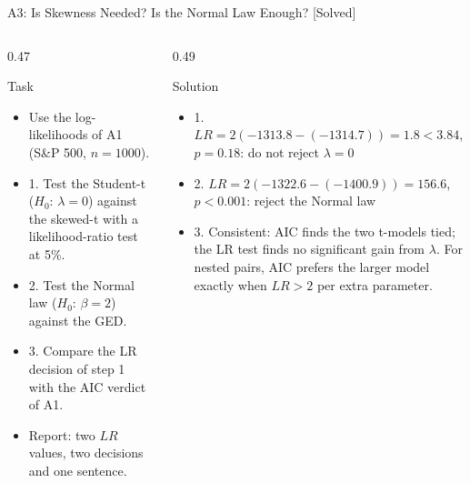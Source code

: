 \begin{frame}{A3: Is Skewness Needed? Is the Normal Law Enough? [Solved]}
\itemsize{\scriptsize}
\begin{columns}[T]
\begin{column}{0.47\textwidth}
\begin{block}{Task}
\begin{itemize}
    \item Use the log-likelihoods of A1 (S\&P 500, $n = 1000$).
    \item 1. Test the Student-t ($H_0$: $\lambda = 0$) against the skewed-t with a likelihood-ratio test at 5\%.
    \item 2. Test the Normal law ($H_0$: $\beta = 2$) against the GED.
    \item 3. Compare the LR decision of step 1 with the AIC verdict of A1.
    \item Report: two $LR$ values, two decisions and one sentence.
\end{itemize}
\end{block}
\end{column}
\begin{column}{0.49\textwidth}
\begin{exampleblock}{Solution}
\begin{itemize}
    \item 1. $LR = 2(-1313.8 - (-1314.7)) = 1.8 < 3.84$, $p = 0.18$: do not reject $\lambda = 0$
    \item 2. $LR = 2(-1322.6 - (-1400.9)) = 156.6$, $p <0.001$: reject the Normal law
    \item 3. Consistent: AIC finds the two t-models tied; the LR test finds no significant gain from $\lambda$. For nested pairs, AIC prefers the larger model exactly when $LR > 2$ per extra parameter.
\end{itemize}
\end{exampleblock}
\end{column}
\end{columns}
\end{frame}

